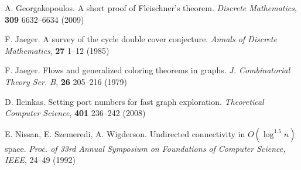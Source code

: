 \documentclass[12pt,letterpaper,oneside]{book}
\begin{document}
\begin{thebibliography}{9}
 A. Georgakopoulos.  A short proof of Fleischner's theorem.  \emph{Discrete Mathematics}, \textbf{309} 6632--6634 (2009)



 F. Jaeger.  A survey of the cycle double cover conjecture.  \emph{Annals of Discrete Mathematics}, 
\textbf{27} 1--12 (1985)  

 F. Jaeger.  Flows and generalized coloring theorems in graphs.  \emph{J. Combinatorial Theory Ser. B}, 
\textbf{26} 205--216 (1979)





 D. Ilcinkas.  Setting port numbers for fast graph exploration.  \emph{Theoretical Computer Science}, 
\textbf{401} 236--242 (2008)  



 E. Nissan, E. Szemeredi, A. Wigderson.  Undirected connectivity in $O(\log^{1.5} n)$ space.  
\emph{Proc. of 33rd Annual Symposium on Foundations of Computer Science, IEEE}, 24--49 (1992)   




\end{thebibliography}
\end{document}
